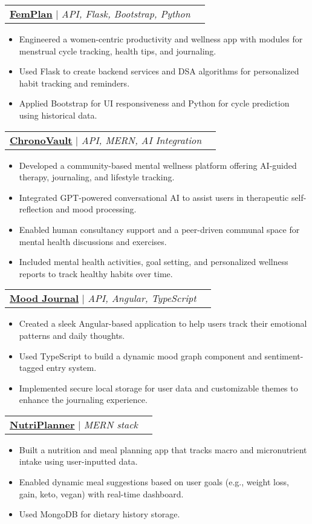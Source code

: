 \documentclass[letterpaper,11pt]{article}
\makeatletter
\newcommand{\resumeItem}[1]{
  \item\small{
    {#1 \vspace{-2pt}}
  }
}
\newcommand{\resumeProjectHeading}[2]{
    \item
    \begin{tabular*}{1.001\textwidth}{l@{\extracolsep{\fill}}r}
      \small#1 & \textbf{\small #2}\\
    \end{tabular*}\vspace{-7pt}
}
\newcommand{\resumeItemListStart}{\begin{itemize}}
\newcommand{\resumeItemListEnd}{\end{itemize}\vspace{-5pt}}
\makeatother
\begin{document}
\resumeProjectHeading
{\textbf{\href{https://github.com/PoojasPatel013}{\textcolor{maincolor}{FemPlan}}} $|$ \emph{API, Flask, Bootstrap, Python}}{}
\vspace{-8pt}
\resumeItemListStart
  \resumeItem{Engineered a women-centric productivity and wellness app with modules for menstrual cycle tracking, health tips, and journaling.}
  \resumeItem{Used Flask to create backend services and DSA algorithms for personalized habit tracking and reminders.}
  \resumeItem{Applied Bootstrap for UI responsiveness and Python for cycle prediction using historical data.}
\resumeItemListEnd 
\vspace{-8pt}

\resumeProjectHeading
{\textbf{\href{https://github.com/PoojasPatel013}{\textcolor{maincolor}{ChronoVault}}} $|$ \emph{API, MERN, AI Integration}}{}
\vspace{-8pt}
\resumeItemListStart
  \resumeItem{Developed a community-based mental wellness platform offering AI-guided therapy, journaling, and lifestyle tracking.}
  \resumeItem{Integrated GPT-powered conversational AI to assist users in therapeutic self-reflection and mood processing.}
  \resumeItem{Enabled human consultancy support and a peer-driven communal space for mental health discussions and exercises.}
  \resumeItem{Included mental health activities, goal setting, and personalized wellness reports to track healthy habits over time.}
\resumeItemListEnd 
\vspace{-8pt}

\resumeProjectHeading
{\textbf{\href{https://github.com/PoojasPatel013}{\textcolor{maincolor}{Mood Journal}}} $|$ \emph{API, Angular, TypeScript}}{}
\vspace{-8pt}
\resumeItemListStart
  \resumeItem{Created a sleek Angular-based application to help users track their emotional patterns and daily thoughts.}
  \resumeItem{Used TypeScript to build a dynamic mood graph component and sentiment-tagged entry system.}
  \resumeItem{Implemented secure local storage for user data and customizable themes to enhance the journaling experience.}
\resumeItemListEnd 
\vspace{-8pt}

\resumeProjectHeading
{\textbf{\href{https://github.com/PoojasPatel013}{\textcolor{maincolor}{NutriPlanner}}} $|$ \emph{MERN stack}}{}
\vspace{-8pt}
\resumeItemListStart
  \resumeItem{Built a nutrition and meal planning app that tracks macro and micronutrient intake using user-inputted data.}
  \resumeItem{Enabled dynamic meal suggestions based on user goals (e.g., weight loss, gain, keto, vegan) with real-time dashboard.}
  \resumeItem{Used MongoDB for dietary history storage.}
\resumeItemListEnd 
\vspace{-8pt}
\end{document}
